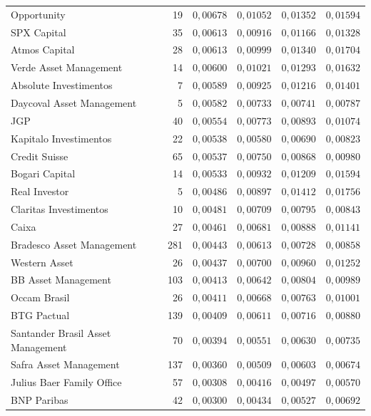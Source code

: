 \documentclass[11pt,a4paper]{article}
\begin{document}
\begin{center}
\begin{longtable}{@{}lrrrrr@{}}
Opportunity & 19 & $0{,}00678$ & $0{,}01052$ & $0{,}01352$ & $0{,}01594$ \\
SPX Capital & 35 & $0{,}00613$ & $0{,}00916$ & $0{,}01166$ & $0{,}01328$ \\
Atmos Capital & 28 & $0{,}00613$ & $0{,}00999$ & $0{,}01340$ & $0{,}01704$ \\
Verde Asset Management & 14 & $0{,}00600$ & $0{,}01021$ & $0{,}01293$ & $0{,}01632$ \\
Absolute Investimentos & 7 & $0{,}00589$ & $0{,}00925$ & $0{,}01216$ & $0{,}01401$ \\
Daycoval Asset Management & 5 & $0{,}00582$ & $0{,}00733$ & $0{,}00741$ & $0{,}00787$ \\
JGP & 40 & $0{,}00554$ & $0{,}00773$ & $0{,}00893$ & $0{,}01074$ \\
Kapitalo Investimentos & 22 & $0{,}00538$ & $0{,}00580$ & $0{,}00690$ & $0{,}00823$ \\
Credit Suisse & 65 & $0{,}00537$ & $0{,}00750$ & $0{,}00868$ & $0{,}00980$ \\
Bogari Capital & 14 & $0{,}00533$ & $0{,}00932$ & $0{,}01209$ & $0{,}01594$ \\
Real Investor & 5 & $0{,}00486$ & $0{,}00897$ & $0{,}01412$ & $0{,}01756$ \\
Claritas Investimentos & 10 & $0{,}00481$ & $0{,}00709$ & $0{,}00795$ & $0{,}00843$ \\
Caixa & 27 & $0{,}00461$ & $0{,}00681$ & $0{,}00888$ & $0{,}01141$ \\
Bradesco Asset Management & 281 & $0{,}00443$ & $0{,}00613$ & $0{,}00728$ & $0{,}00858$ \\
Western Asset & 26 & $0{,}00437$ & $0{,}00700$ & $0{,}00960$ & $0{,}01252$ \\
BB Asset Management & 103 & $0{,}00413$ & $0{,}00642$ & $0{,}00804$ & $0{,}00989$ \\
Occam Brasil & 26 & $0{,}00411$ & $0{,}00668$ & $0{,}00763$ & $0{,}01001$ \\
BTG Pactual & 139 & $0{,}00409$ & $0{,}00611$ & $0{,}00716$ & $0{,}00880$ \\
Santander Brasil Asset Management & 70 & $0{,}00394$ & $0{,}00551$ & $0{,}00630$ & $0{,}00735$ \\
Safra Asset Management & 137 & $0{,}00360$ & $0{,}00509$ & $0{,}00603$ & $0{,}00674$ \\
Julius Baer Family Office & 57 & $0{,}00308$ & $0{,}00416$ & $0{,}00497$ & $0{,}00570$ \\
BNP Paribas & 42 & $0{,}00300$ & $0{,}00434$ & $0{,}00527$ & $0{,}00692$ \\

\end{longtable}
\end{center}
\end{document}
